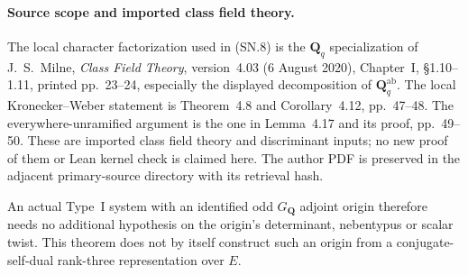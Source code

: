 \paragraph{Source scope and imported class field theory.}
The local character factorization used in (SN.8) is the
$\mathbf Q_q$ specialization of J.~S.~Milne,
\emph{Class Field Theory}, version~4.03 (6 August 2020),
Chapter~I, \S1.10--1.11, printed pp.~23--24, especially
the displayed decomposition of $\mathbf Q_q^{\mathrm{ab}}$.
The local Kronecker--Weber statement is Theorem~4.8 and
Corollary~4.12, pp.~47--48.  The everywhere-unramified argument
is the one in Lemma~4.17 and its proof, pp.~49--50.
These are imported class field theory and discriminant inputs;
no new proof of them or Lean kernel check is claimed here.
The author PDF is preserved in the adjacent primary-source
directory with its retrieval hash.

An actual Type~I system with an identified odd $G_{\mathbf Q}$
adjoint origin therefore needs no additional hypothesis on the
origin's determinant, nebentypus or scalar twist.  This theorem
does not by itself construct such an origin from a
conjugate-self-dual rank-three representation over $E$.
